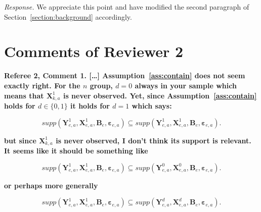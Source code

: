 \noindent \textit{Response.} We appreciate this point and have modified the second paragraph of Section~\ref{section:background} accordingly.

\section*{Comments of Reviewer 2}

\noindent \textbf{Referee 2, Comment 1. [\ldots] Assumption~\ref{ass:contain} does not seem exactly right. For the $n$ group, $d = 0$ always in your sample which means that $\bm{X}_{k,a}^1$ is never observed. Yet, since Assumption~\ref{ass:contain} holds for $d \in \{ 0,1 \}$ it holds for $d = 1$ which says:}

\begin{equation}
supp( \bm{Y}_{e,a}^1, \bm{X}^1_{e,a}, \bm{B}_e, \bm{\varepsilon}_{e,a} ) \subseteq supp( \bm{Y}_{e,a}^1, \bm{X}^1_{e,a}, \bm{B}_e, \bm{\varepsilon}_{e,a} ). \label{eq:ref1}
\end{equation}

\textbf{but since $\bm{X}_{k,a}^1$ is never observed, I don't think its support is relevant. It seems like it should be something like}

\begin{equation}
supp( \bm{Y}_{e,a}^1, \bm{X}^1_{e,a}, \bm{B}_e, \bm{\varepsilon}_{e,a} ) \subseteq supp( \bm{Y}_{e,a}^0, \bm{X}^0_{e,a}, \bm{B}_e, \bm{\varepsilon}_{e,a} ).  \label{eq:ref2}
\end{equation}

\textbf{or perhaps more generally}

\begin{equation}
supp( \bm{Y}_{e,a}^1, \bm{X}^1_{e,a}, \bm{B}_e, \bm{\varepsilon}_{e,a} ) \subseteq supp( \bm{Y}_{e,a}^d, \bm{X}^d_{e,a}, \bm{B}_e, \bm{\varepsilon}_{e,a} ).  \label{eq:ref3}
\end{equation}

